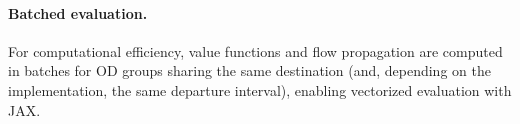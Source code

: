 \paragraph{Batched evaluation.}
For computational efficiency, value functions and flow propagation are computed in batches for OD groups sharing the same destination
(and, depending on the implementation, the same departure interval), enabling vectorized evaluation with JAX.

